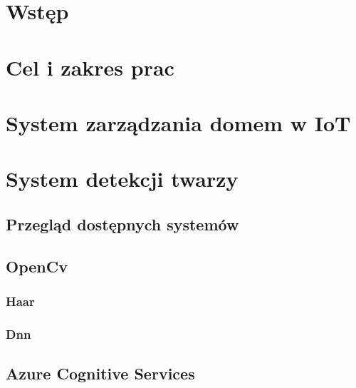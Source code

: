 \documentclass[11pt, a4paper,polish,twoside]{report}
\begin{document}



\newpage
\null
\thispagestyle{empty}
\newpage




\tableofcontents

\chapter{Wstęp}


\chapter{Cel i zakres prac}


\chapter{System zarządzania domem w IoT}


\chapter{System detekcji twarzy} \label{detekcja_twarzy}
\section{Przegląd dostępnych systemów}
\section{OpenCv}
\subsection{Haar}
\subsection{Dnn}
\section{Azure Cognitive Services}
\end{document}

